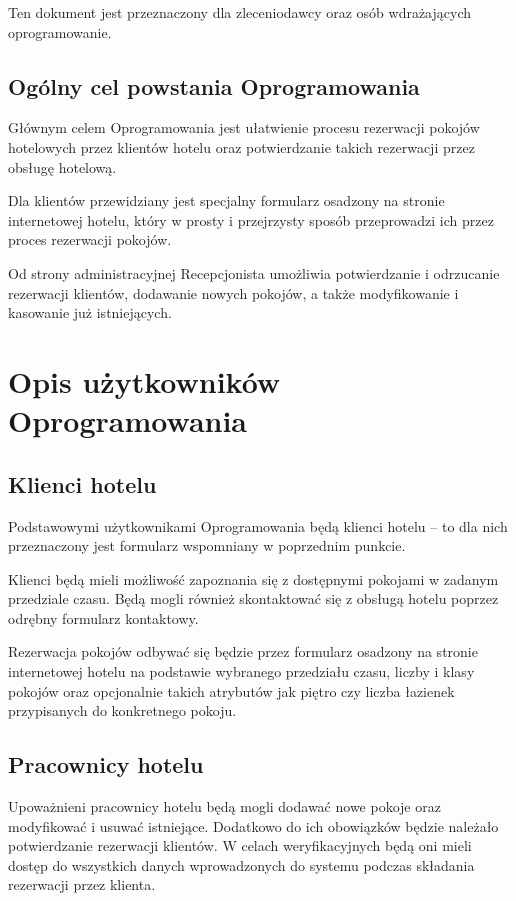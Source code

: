 \documentclass [11pt, a4paper, leqno] {article}
\begin{document}
Ten dokument jest przeznaczony dla zleceniodawcy oraz osób wdrażających oprogramowanie.

\subsection{Ogólny cel powstania Oprogramowania}
\noindent
Głównym celem Oprogramowania jest ułatwienie procesu rezerwacji pokojów hotelowych przez klientów hotelu oraz potwierdzanie takich rezerwacji przez obsługę hotelową.

Dla klientów przewidziany jest specjalny formularz osadzony na stronie internetowej hotelu, który w prosty i przejrzysty sposób przeprowadzi ich przez proces rezerwacji pokojów.

Od strony administracyjnej Recepcjonista umożliwia potwierdzanie i odrzucanie rezerwacji klientów, dodawanie nowych pokojów, a także modyfikowanie i kasowanie już istniejących.

\section{Opis użytkowników Oprogramowania}

\subsection{Klienci hotelu}
\noindent
Podstawowymi użytkownikami Oprogramowania będą klienci hotelu -- to dla nich przeznaczony jest formularz wspomniany w poprzednim punkcie.

Klienci będą mieli możliwość zapoznania się z dostępnymi pokojami w zadanym przedziale czasu. Będą mogli również skontaktować się z obsługą hotelu poprzez odrębny formularz kontaktowy.

Rezerwacja pokojów odbywać się będzie przez formularz osadzony na stronie internetowej hotelu na podstawie wybranego przedziału czasu, liczby i klasy pokojów oraz opcjonalnie takich atrybutów jak piętro czy liczba łazienek przypisanych do konkretnego pokoju.

\subsection{Pracownicy hotelu}
\noindent
Upoważnieni pracownicy hotelu będą mogli dodawać nowe pokoje oraz modyfikować i usuwać istniejące. Dodatkowo do ich obowiązków będzie należało potwierdzanie rezerwacji klientów. W celach weryfikacyjnych będą oni mieli dostęp do wszystkich danych wprowadzonych do systemu podczas składania rezerwacji przez klienta.
\end{document}
